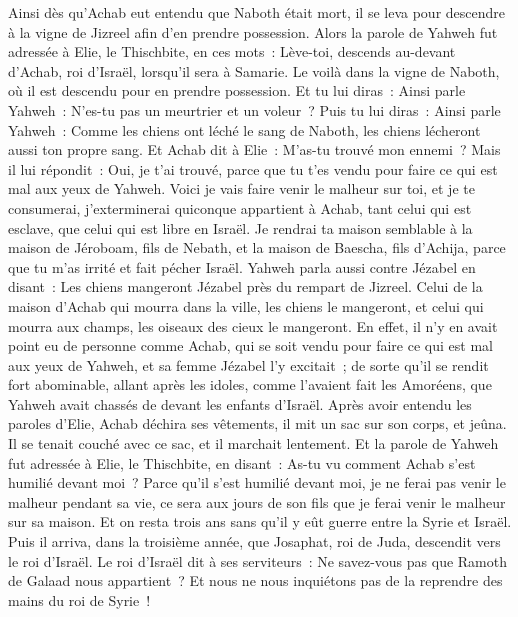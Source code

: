 \begin{multicols}{2}
Ainsi dès qu'Achab eut entendu que Naboth était mort, il se leva pour descendre à la vigne de Jizreel afin d'en prendre  possession.
Alors la parole de Yahweh fut adressée à Elie, le Thischbite, en ces mots~:
Lève-toi, descends au-devant d'Achab, roi d'Israël, lorsqu'il sera à Samarie. Le voilà dans la vigne de Naboth, où il est descendu pour en prendre possession.
Et tu lui diras~: Ainsi parle Yahweh~: N'es-tu pas un meurtrier et un voleur~? Puis tu lui diras~: Ainsi parle Yahweh~: Comme les chiens ont léché le sang de Naboth, les chiens lécheront aussi ton propre sang.
Et Achab dit à Elie~: M'as-tu trouvé mon ennemi~? Mais il lui répondit~: Oui, je t'ai trouvé, parce que tu t'es vendu pour faire ce qui est mal aux yeux de Yahweh.
Voici je vais faire venir le malheur sur toi, et je te consumerai, j'exterminerai quiconque appartient à Achab, tant celui qui est esclave, que celui qui est libre en Israël.
Je rendrai ta maison semblable à la maison de Jéroboam, fils de Nebath, et la maison de Baescha, fils d'Achija, parce que tu m'as irrité et fait pécher Israël.
Yahweh parla aussi contre Jézabel en disant~: Les chiens mangeront Jézabel près du rempart de Jizreel.
Celui de la maison d'Achab qui mourra dans la ville, les chiens le mangeront, et celui qui mourra aux champs, les oiseaux des cieux le mangeront.
En effet, il n'y en avait point eu de personne comme Achab, qui se soit vendu pour faire ce qui est mal aux yeux de Yahweh, et sa femme Jézabel l'y excitait~;
de sorte qu'il se rendit fort abominable, allant après les idoles, comme l'avaient fait les Amoréens, que Yahweh avait chassés de devant les enfants d'Israël.
Après avoir entendu les paroles d'Elie, Achab déchira ses vêtements, il mit un sac sur son corps, et jeûna. Il se tenait couché avec ce sac, et il marchait lentement.
Et la parole de Yahweh fut adressée à Elie, le Thischbite, en disant~:
As-tu vu comment Achab s'est humilié devant moi~? Parce qu'il s'est humilié devant moi, je ne ferai pas venir le malheur pendant sa vie, ce sera aux jours de son fils que je ferai venir le malheur sur sa maison.
\VerseOne{}Et on resta trois ans sans qu'il y eût guerre entre la Syrie et Israël.
Puis il arriva, dans la troisième année, que Josaphat, roi de Juda, descendit vers le roi d'Israël.
Le roi d'Israël dit à ses serviteurs~: Ne savez-vous pas que Ramoth de Galaad nous appartient~? Et nous ne nous inquiétons pas de la reprendre des mains du roi de Syrie~!

\end{multicols}
